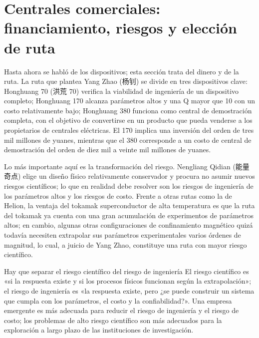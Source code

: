 \section{Centrales comerciales: financiamiento, riesgos y elección de ruta}

Hasta ahora se habló de los dispositivos; esta sección trata del dinero y de la ruta. La ruta que plantea Yang Zhao (杨钊) se divide en tres dispositivos clave: Honghuang 70 (洪荒 70) verifica la viabilidad de ingeniería de un dispositivo completo; Honghuang 170 alcanza parámetros altos y una Q mayor que 10 con un costo relativamente bajo; Honghuang 380 funciona como central de demostración completa, con el objetivo de convertirse en un producto que pueda venderse a los propietarios de centrales eléctricas. El 170 implica una inversión del orden de tres mil millones de yuanes, mientras que el 380 corresponde a un costo de central de demostración del orden de diez mil a veinte mil millones de yuanes.

Lo más importante aquí es la transformación del riesgo. Nengliang Qidian (能量奇点) elige un diseño físico relativamente conservador y procura no asumir nuevos riesgos científicos; lo que en realidad debe resolver son los riesgos de ingeniería de los parámetros altos y los riesgos de costo. Frente a otras rutas como la de Helion, la ventaja del tokamak superconductor de alta temperatura es que la ruta del tokamak ya cuenta con una gran acumulación de experimentos de parámetros altos; en cambio, algunas otras configuraciones de confinamiento magnético quizá todavía necesiten extrapolar sus parámetros experimentales varios órdenes de magnitud, lo cual, a juicio de Yang Zhao, constituye una ruta con mayor riesgo científico.

\begin{warningbox}{Hay que separar el riesgo científico del riesgo de ingeniería}
El riesgo científico es «si la respuesta existe y si los procesos físicos funcionan según la extrapolación»; el riesgo de ingeniería es «la respuesta existe, pero ¿se puede construir un sistema que cumpla con los parámetros, el costo y la confiabilidad?». Una empresa emergente es más adecuada para reducir el riesgo de ingeniería y el riesgo de costo; los problemas de alto riesgo científico son más adecuados para la exploración a largo plazo de las instituciones de investigación.
\end{warningbox}

